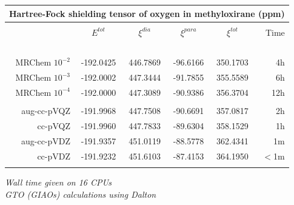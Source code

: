 \begin{frame}
\begin{table}
\centering
\begin{tabular}{r|c|cccr}
\multicolumn{6}{c}{\textbf{Hartree-Fock shielding tensor of oxygen in methyloxirane (ppm)}}\\
\hline
\hline
                     &               &               &               &               &               \\
                     & $E^{tot}$     &$\xi^{dia}$    & $\xi^{para}$  &$\xi^{tot}$    &Time           \\
       	             &\hspace{15mm}\ &\hspace{15mm}\ &\hspace{15mm}\ &\hspace{15mm}\ &\hspace{05mm}\ \\
    MRChem $10^{-2}$ & -192.0425     &  446.7869     &  -96.6166     &  350.1703     &    4h         \\
    MRChem $10^{-3}$ & -192.0002     &  447.3444     &  -91.7855     &  355.5589     &    6h         \\
    MRChem $10^{-4}$ & -192.0000     &  447.3089     &  -90.9386     &  356.3704     &   12h         \\
	             &               &               &               &               &               \\
    aug-cc-pVQZ      & -191.9968     &  447.7508     &  -90.6691     &  357.0817     &    2h         \\
	cc-pVQZ      & -191.9960     &  447.7833     &  -89.6304     &  358.1529     &    1h         \\
    aug-cc-pVDZ      & -191.9357     &  451.0119     &  -88.5778     &  362.4341     &    1m         \\
	cc-pVDZ      & -191.9232     &  451.6103     &  -87.4153     &  364.1950     &    $<$1m      \\
	             &               &               &               &               &               \\
\hline
\hline
\end{tabular}
\end{table}

\centering
\it{Wall time given on 16 CPUs}\\
\it{GTO (GIAOs) calculations using Dalton}

\end{frame}


